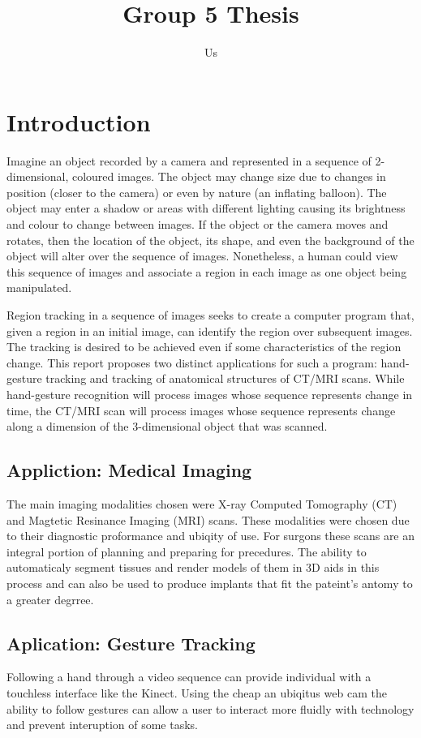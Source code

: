 \documentclass{article}
\title{Group 5 Thesis}
\author{Us}
\begin{document}
	\maketitle
	\tableofcontents
	\newpage
	\section{Introduction}
		Imagine an object recorded by a camera and represented in a sequence of 2-dimensional, coloured images. The object may change size due to changes in position (closer to the camera) or even by nature (an inflating balloon). The object may enter a shadow or areas with different lighting causing its brightness and colour to change between images. If the object or the camera moves and rotates, then the location of the object, its shape, and even the background of the object will alter over the sequence of images. Nonetheless, a human could view this sequence of images and associate a region in each image as one object being manipulated. 

		Region tracking in a sequence of images seeks to create a computer program that, given a region in an initial image, can identify the region over subsequent images. The tracking is desired to be achieved even if some characteristics of the region change. This report proposes two distinct applications for such a program: hand-gesture tracking and tracking of anatomical structures of CT/MRI scans. While hand-gesture recognition will process images whose sequence represents change in time, the CT/MRI scan will process images whose sequence represents change along a dimension of the 3-dimensional object that was scanned.

		\subsection{Appliction: Medical Imaging}
			The main imaging modalities chosen were X-ray Computed Tomography (CT) and Magtetic Resinance Imaging (MRI) scans. These modalities were chosen due to their diagnostic proformance and ubiqity of use. For surgons these scans are an integral portion of planning and preparing for precedures. The ability to automaticaly segment tissues and render models of them in 3D aids in this process and can also be used to produce implants that fit the pateint's antomy to a greater degrree.


		\subsection{Aplication: Gesture Tracking}
			Following a hand through a video sequence can provide individual with a touchless interface like the Kinect. Using the cheap an ubiqitus web cam the ability to follow gestures can allow a user to interact more fluidly with technology and prevent interuption of some tasks.
\end{document}
